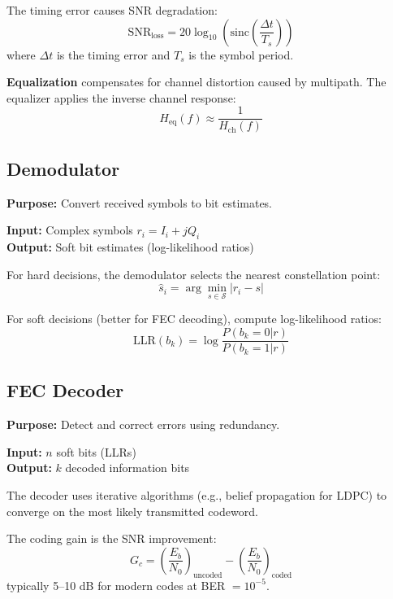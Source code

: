 The timing error causes SNR degradation:
\begin{equation}
\mathrm{SNR}_{\mathrm{loss}} = 20\log_{10}\left(\mathrm{sinc}\left(\frac{\Delta t}{T_s}\right)\right)
\end{equation}
where $\Delta t$ is the timing error and $T_s$ is the symbol period.

\textbf{Equalization} compensates for channel distortion caused by multipath. The equalizer applies the inverse channel response:
\begin{equation}
H_{\mathrm{eq}}(f) \approx \frac{1}{H_{\mathrm{ch}}(f)}
\end{equation}

\subsection{Demodulator}

\textbf{Purpose:} Convert received symbols to bit estimates.

\textbf{Input:} Complex symbols $r_i = I_i + jQ_i$\\
\textbf{Output:} Soft bit estimates (log-likelihood ratios)

For hard decisions, the demodulator selects the nearest constellation point:
\begin{equation}
\hat{s}_i = \arg\min_{s \in \mathcal{S}} |r_i - s|
\end{equation}

For soft decisions (better for FEC decoding), compute log-likelihood ratios:
\begin{equation}
\mathrm{LLR}(b_k) = \log\frac{P(b_k = 0 | r)}{P(b_k = 1 | r)}
\end{equation}

\subsection{FEC Decoder}

\textbf{Purpose:} Detect and correct errors using redundancy.

\textbf{Input:} $n$ soft bits (LLRs)\\
\textbf{Output:} $k$ decoded information bits

The decoder uses iterative algorithms (e.g., belief propagation for LDPC) to converge on the most likely transmitted codeword. 

The coding gain is the SNR improvement:
\begin{equation}
G_c = \left(\frac{E_b}{N_0}\right)_{\mathrm{uncoded}} - \left(\frac{E_b}{N_0}\right)_{\mathrm{coded}}
\end{equation}
typically 5--10 dB for modern codes at BER $= 10^{-5}$.


